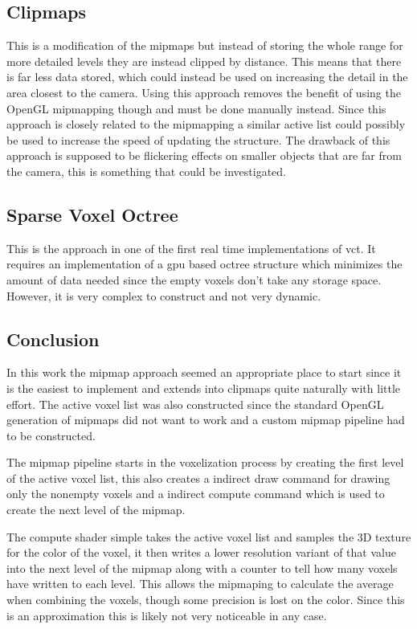 \subsection{Clipmaps}

This is a modification of the mipmaps but instead of storing the whole range for more detailed levels they are instead clipped by distance. This means that there is far less data stored, which could instead be used on increasing the detail in the area closest to the camera. Using this approach removes the benefit of using the OpenGL mipmapping though and must be done manually instead. Since this approach is closely related to the mipmapping a similar active list could possibly be used to increase the speed of updating the structure. The drawback of this approach is supposed to be flickering effects on smaller objects that are far from the camera, this is something that could be investigated.

\subsection{Sparse Voxel Octree}

This is the approach in one of the first real time implementations of \gls{vct}. It requires an implementation of a \gls{gpu} based octree structure which minimizes the amount of data needed since the empty voxels don't take any storage space. However, it is very complex to construct and not very dynamic.

\subsection{Conclusion}

In this work the mipmap approach seemed an appropriate place to start since it is the easiest to implement and extends into clipmaps quite naturally with little effort. The active voxel list was also constructed since the standard OpenGL generation of mipmaps did not want to work and a custom mipmap pipeline had to be constructed. 

The mipmap pipeline starts in the voxelization process by creating the first level of the active voxel list, this also creates a indirect draw command for drawing only the nonempty voxels and a indirect compute command which is used to create the next level of the mipmap. 

The compute shader simple takes the active voxel list and samples the 3D texture for the color of the voxel, it then writes a lower resolution variant of that value into the next level of the mipmap along with a counter to tell how many voxels have written to each level. This allows the mipmaping to calculate the average when combining the voxels, though some precision is lost on the color. Since this is an approximation this is likely not very noticeable in any case.

